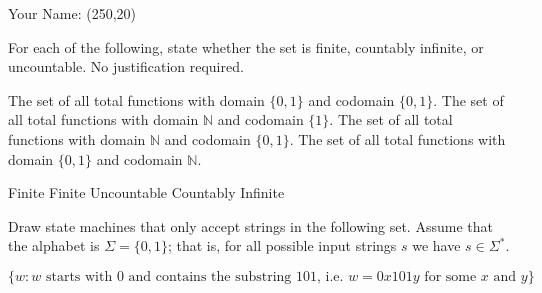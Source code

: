 \documentclass[solution, letterpaper]{cs20exam}
\newcommand{\namebox}{\framebox(250,20){}}
\begin{document}

\vspace{-1.8in}\hbox{}\hspace{2in}Your Name: \namebox
\vspace{1.2in}


\problem{}{}

For each of the following, state whether the set is finite, countably infinite, or uncountable. No justification required.

\subproblem The set of all total functions with domain $\{0, 1\}$ and codomain $\{0, 1\}$.
\subproblem The set of all total functions with domain $\mathbb{N}$ and codomain $\{1\}$.
\subproblem The set of all total functions with domain $\mathbb{N}$ and codomain $\{0, 1\}$.
\subproblem The set of all total functions with domain $\{0, 1\}$ and codomain $\mathbb{N}$.

\begin{solution}
\subsolution Finite
\subsolution Finite
\subsolution Uncountable
\subsolution Countably Infinite
\end{solution}



\problem{}{}

Draw state machines that only accept strings in the following set. Assume that the alphabet is $\Sigma = \{0, 1\}$; that is, for all possible input strings $s$ we have $s \in \Sigma^*$.

$$\{w : w \text{ starts with } 0 \text{ and contains the substring } 101 \text{, i.e. } w = 0x101y \text{ for some } x \text{ and } y \}$$
\end{document}

